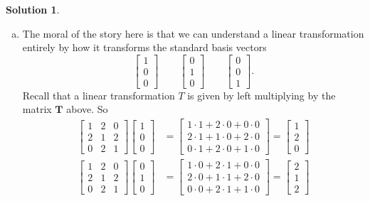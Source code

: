\documentclass[12pt]{report} %
\theoremstyle{definition}
\newtheorem{solution}{Solution}
\begin{document}
\begin{solution}
\begin{enumerate}[(a)]
    \item The moral of the story here is that we can understand a linear transformation entirely by how it transforms the standard basis vectors
    \[
    \begin{bmatrix} 1 \\ 0 \\ 0\end{bmatrix} \qquad \begin{bmatrix} 0 \\ 1 \\ 0 \end{bmatrix} \qquad \begin{bmatrix} 0 \\ 0 \\ 1\end{bmatrix}.
    \]
    Recall that a linear transformation $T$ is given by left multiplying by the matrix $\mathbf{T}$ above. So
    \begin{align*}
        \begin{bmatrix} 1 & 2 & 0\\ 2 & 1 & 2 \\ 0 & 2 & 1\end{bmatrix} \begin{bmatrix} 1 \\ 0\\ 0\end{bmatrix}&= \begin{bmatrix} 1\cdot 1 + 2 \cdot 0 + 0\cdot 0\\ 2\cdot 1 + 1 \cdot 0 + 2\cdot 0 \\ 0 \cdot 1 + 2 \cdot 0 + 1 \cdot 0\end{bmatrix} = \begin{bmatrix} 1 \\ 2 \\ 0\end{bmatrix}\\
        \begin{bmatrix} 1 & 2 & 0\\ 2 & 1 & 2 \\ 0 & 2 & 1\end{bmatrix} \begin{bmatrix} 0 \\ 1\\ 0\end{bmatrix}&= \begin{bmatrix} 1\cdot 0 + 2 \cdot 1 + 0\cdot 0\\ 2\cdot 0 + 1 \cdot 1 + 2\cdot 0 \\ 0 \cdot 0 + 2 \cdot 1 + 1 \cdot 0\end{bmatrix} = \begin{bmatrix} 2 \\ 1 \\ 2\end{bmatrix}\\

\end{align*}
\end{enumerate}
\end{solution}
\end{document}
